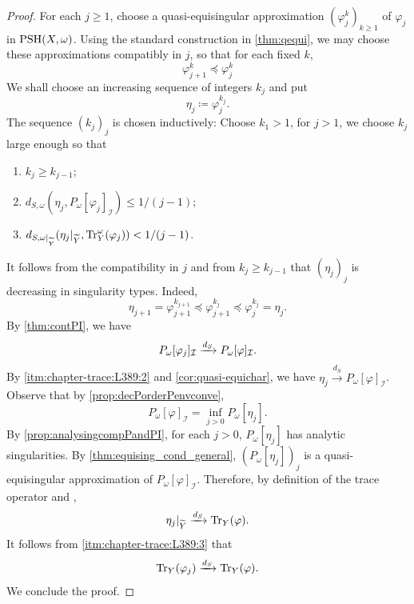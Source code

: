 \begin{proof}
    For each $j\geq 1$, choose a quasi-equisingular approximation $(\varphi_j^k)_{k\geq 1}$ of $\varphi_j$ in $\mathrm{PSH}(X,\omega)$. Using the standard construction in \cref{thm:qequi}, we may choose these approximations compatibly in $j$, so that for each fixed $k$,
    \[
        \varphi_{j+1}^k\preceq \varphi_j^k
    \]
    We shall choose an increasing sequence of integers $k_j$ and put
    \[
        \eta_j\coloneqq \varphi_j^{k_j}.
    \]
    The sequence $(k_j)_j$ is chosen inductively: Choose $k_1>1$, for $j>1$, we choose $k_j$ large enough so that
    \begin{enumerate}
        \item\label{itm:chapter-trace:L389:1} $k_{j}\geq k_{j-1}$;
        \item\label{itm:chapter-trace:L389:2} $d_{S,\omega}(\eta_j,P_{\omega}[\varphi_j]_{\mathcal{I}})\leq 1/(j-1)$;
        \item\label{itm:chapter-trace:L389:3} $d_{S,\omega|_{\widetilde{Y}}}(\eta_j|_{\widetilde{Y}},\operatorname{Tr}_Y^{\omega}(\varphi_j))<1/(j-1)$.
    \end{enumerate}
    It follows from the compatibility in $j$ and from $k_j\geq k_{j-1}$ that $(\eta_j)_j$ is decreasing in singularity types. Indeed,
    \[
        \eta_{j+1}=\varphi_{j+1}^{k_{j+1}}\preceq \varphi_{j+1}^{k_j}\preceq \varphi_j^{k_j}=\eta_j.
    \]
    By \cref{thm:contPI}, we have
    \[
        P_{\omega}[\varphi_j]_{\mathcal{I}}\xrightarrow[]{d_S} P_{\omega}[\varphi]_{\mathcal{I}}.
    \]
    By \ref{itm:chapter-trace:L389:2} and \cref{cor:quasi-equichar}, we have $\eta_j\xrightarrow{d_S} P_{\omega}[\varphi]_{\mathcal{I}}$. Observe that by \cref{prop:decPorderPenvconve},
    \[
        P_{\omega}[\varphi]_{\mathcal{I}}=\inf_{j>0} P_{\omega}\left[\eta_j\right].
    \]
    By \cref{prop:analysingcompPandPI}, for each $j>0$, $P_{\omega}[\eta_j]$ has analytic singularities. By \cref{thm:equising_cond_general}, $(P_{\omega}[\eta_j])_j$ is a quasi-equisingular approximation of $P_{\omega}[\varphi]_{\mathcal{I}}$. Therefore, by definition of the trace operator and ,
    \[
        \eta_j|_{\widetilde{Y}}\xrightarrow{d_S} \operatorname{Tr}_Y(\varphi).
    \]
    It follows from \ref{itm:chapter-trace:L389:3} that
    \[
        \operatorname{Tr}_Y(\varphi_j)\xrightarrow{d_S}\operatorname{Tr}_Y(\varphi).
    \]
    We conclude the proof.
\end{proof}

